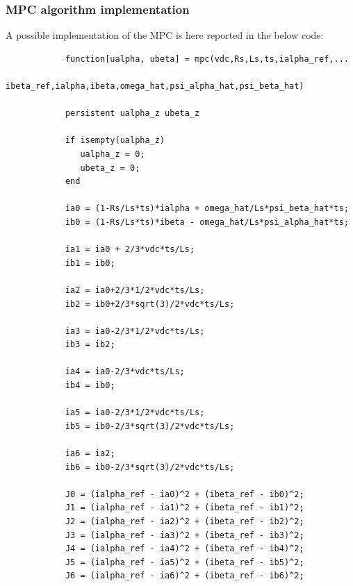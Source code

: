 \documentclass[11pt,a4paper,oneside]{book}
\numberwithin{equation}{section}
\theoremstyle{it}
\theoremstyle{definition}
\begin{document}
\subsubsection{MPC algorithm implementation}
A possible implementation of the MPC is here reported in the below code:
\begin{mybox}
	{\selectfont \footnotesize \noindent
		\begin{verbatim}
			function[ualpha, ubeta] = mpc(vdc,Rs,Ls,ts,ialpha_ref,...
			                    ibeta_ref,ialpha,ibeta,omega_hat,psi_alpha_hat,psi_beta_hat)
			
			persistent ualpha_z ubeta_z
			
			if isempty(ualpha_z)
			   ualpha_z = 0;
			   ubeta_z = 0;
			end
			
			ia0 = (1-Rs/Ls*ts)*ialpha + omega_hat/Ls*psi_beta_hat*ts;
			ib0 = (1-Rs/Ls*ts)*ibeta - omega_hat/Ls*psi_alpha_hat*ts;
			
			ia1 = ia0 + 2/3*vdc*ts/Ls;
			ib1 = ib0;
			
			ia2 = ia0+2/3*1/2*vdc*ts/Ls;
			ib2 = ib0+2/3*sqrt(3)/2*vdc*ts/Ls;
			
			ia3 = ia0-2/3*1/2*vdc*ts/Ls;
			ib3 = ib2;
			
			ia4 = ia0-2/3*vdc*ts/Ls;
			ib4 = ib0;    
			
			ia5 = ia0-2/3*1/2*vdc*ts/Ls;
			ib5 = ib0-2/3*sqrt(3)/2*vdc*ts/Ls;
			
			ia6 = ia2;
			ib6 = ib0-2/3*sqrt(3)/2*vdc*ts/Ls;
			
			J0 = (ialpha_ref - ia0)^2 + (ibeta_ref - ib0)^2;
			J1 = (ialpha_ref - ia1)^2 + (ibeta_ref - ib1)^2;
			J2 = (ialpha_ref - ia2)^2 + (ibeta_ref - ib2)^2;
			J3 = (ialpha_ref - ia3)^2 + (ibeta_ref - ib3)^2;
			J4 = (ialpha_ref - ia4)^2 + (ibeta_ref - ib4)^2;
			J5 = (ialpha_ref - ia5)^2 + (ibeta_ref - ib5)^2;
			J6 = (ialpha_ref - ia6)^2 + (ibeta_ref - ib6)^2;
			

\end{verbatim}}
\end{mybox}
\end{document}
